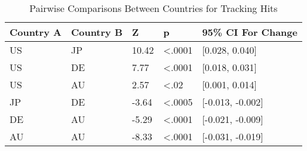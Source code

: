 \documentclass[journal]{IEEEtran}
\begin{document}
\begin{table}[t]
\centering
\caption{Pairwise Comparisons Between Countries for Tracking Hits}
\label{pairwise}
\begin{tabular}{|l|l|l|l|l|}
   \hline
\textbf{Country A} & \textbf{Country B} & \textbf{Z}     & \textbf{p}              & 9\textbf{5\% CI For Change}   \\    \hline
US        & JP        & 10.42 & \textless.0001 & {[}0.028, 0.040{]}   \\   \hline
US        & DE        & 7.77  & \textless.0001 & {[}0.018, 0.031{]}   \\   \hline
US        & AU        & 2.57  & \textless.02   & {[}0.001, 0.014{]}   \\   \hline
JP        & DE        & -3.64 & \textless.0005 & {[}-0.013, -0.002{]} \\   \hline
DE        & AU        & -5.29 & \textless.0001 & {[}-0.021, -0.009{]} \\   \hline
AU        & AU        & -8.33 & \textless.0001 & {[}-0.031, -0.019{]}\\   \hline
\end{tabular}
\end{table}
\end{document}
